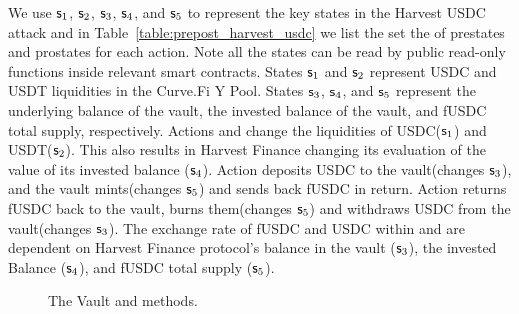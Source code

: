 We use $\mathsf{s}_{1}$, $\mathsf{s}_{2}$, $\mathsf{s}_{3}$, $\mathsf{s}_{4}$, and $\mathsf{s}_{5}$ to represent the key states in the Harvest USDC attack 
and in Table~\ref{table:prepost_harvest_usdc} we list the set the of prestates and prostates for each action. Note all the states can be read by public read-only functions inside relevant smart contracts. States $\mathsf{s}_{1}$ and $\mathsf{s}_{2}$ represent USDC and USDT liquidities in the Curve.Fi Y Pool. States $\mathsf{s}_{3}$, $\mathsf{s}_{4}$, and $\mathsf{s}_{5}$ represent the underlying balance of the vault, the invested balance of the vault, and fUSDC total supply, respectively. 
Actions  and  change the liquidities of USDC($\mathsf{s}_{1}$) and USDT($\mathsf{s}_{2}$). This also results in Harvest Finance changing its evaluation of the value of its invested balance ($\mathsf{s}_{4}$). Action  deposits USDC to the vault(changes $\mathsf{s}_{3}$), and the vault mints(changes $\mathsf{s}_{5}$) and sends back fUSDC in return. Action  returns fUSDC back to the vault, burns them(changes $\mathsf{s}_{5}$) and withdraws USDC from the vault(changes $\mathsf{s}_{3}$). The exchange rate of fUSDC and USDC within  and  are dependent on Harvest Finance protocol's balance in the vault ($\mathsf{s}_{3}$), the invested Balance ($\mathsf{s}_{4}$), and fUSDC total supply ($\mathsf{s}_{5}$).


\begin{figure}[t]
    \centering
    \begin{minipage}[h]{1.0\linewidth}
    
    \end{minipage}
    \vspace{-3mm}
    \caption{The Vault  and  methods.}
 \label{fig:depositwithdraw}
 \vspace{-5mm}
\end{figure}


